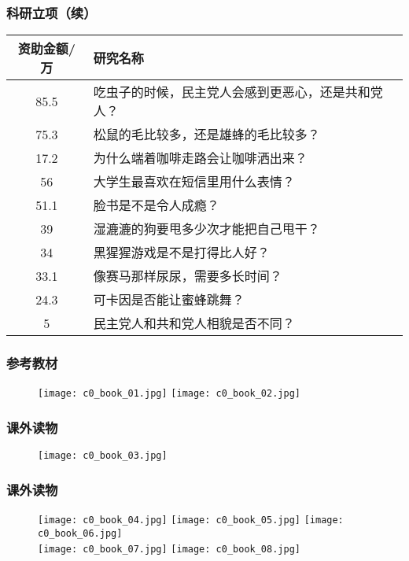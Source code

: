 \begin{frame}
  \frametitle{科研立项（续）}
    \begin{table}
    \centering
    \begin{tabular}{cl}
      \hline
      \rowcolor{blue!50}资助金额/万 & 研究名称\\
      \hline
      85.5 & 吃虫子的时候，民主党人会感到更恶心，还是共和党人？\\
      75.3 & 松鼠的毛比较多，还是雄蜂的毛比较多？\\
      17.2 & 为什么端着咖啡走路会让咖啡洒出来？\\
      56 & 大学生最喜欢在短信里用什么表情？\\
      51.1 & 脸书是不是令人成瘾？\\
      39 & 湿漉漉的狗要甩多少次才能把自己甩干？\\
      34 & 黑猩猩游戏是不是打得比人好？\\
      33.1 & 像赛马那样尿尿，需要多长时间？\\
      24.3 & 可卡因是否能让蜜蜂跳舞？\\
      5 & 民主党人和共和党人相貌是否不同？\\
      \hline
    \end{tabular}
  \end{table}
\end{frame}

\begin{frame}
  \frametitle{参考教材}
  \begin{figure}
    \centering
    \texttt{[image: c0\_book\_01.jpg]}
    \qquad
    \texttt{[image: c0\_book\_02.jpg]}
  \end{figure}
\end{frame}

\begin{frame}
  \frametitle{课外读物}
  \begin{figure}
    \centering
    \texttt{[image: c0\_book\_03.jpg]}
  \end{figure}
\end{frame}

\begin{frame}
  \frametitle{课外读物}
  \begin{figure}
    \centering
    \texttt{[image: c0\_book\_04.jpg]}\quad
    \texttt{[image: c0\_book\_05.jpg]}\quad
    \texttt{[image: c0\_book\_06.jpg]}\\
    \texttt{[image: c0\_book\_07.jpg]}\hspace{1cm}
    \texttt{[image: c0\_book\_08.jpg]}
  \end{figure}
\end{frame}

